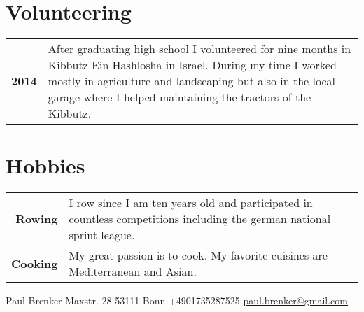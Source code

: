 \documentclass{style/modernsimplecv}
\newlength{\rightcolwidth}
\newlength{\leftcolwidth}
\begin{document}
\begin{paracol}{2}
\begin{minipage}[t]{\leftcolwidth}
\end{minipage}\hfill

\bigskip

\begin{minipage}[t]{\rightcolwidth}
\section*{Volunteering}
\begin{tabular}{>{\small\bfseries}r >{\small}p{}}
    2014 & After graduating high school I volunteered for nine months in Kibbutz Ein Hashlosha in Israel. During my time I worked mostly in agriculture and landscaping but also in the local garage where I helped maintaining the tractors of the Kibbutz. \\
    
\end{tabular}
\bigskip

\section*{Hobbies}
\begin{tabular}{>{\small\bfseries}r >{\small}p{}}
    Rowing & I row since I am ten years old and participated in countless competitions including the german national sprint league. \\
    Cooking & My great passion is to cook. My favorite cuisines are Mediterranean and Asian.
\end{tabular}
\end{minipage}









\end{paracol}

\vfill{} %

\setlength{\parindent}{0pt}
\begin{minipage}[t]{\textwidth}
\begin{center}\fontfamily{\sfdefault}\selectfont \color{black!70}
{\small Paul Brenker  Maxstr. 28  53111 Bonn  +4901735287525 
 \protect\url{paul.brenker@gmail.com}
}
\end{center}
\end{minipage}
\end{document}
